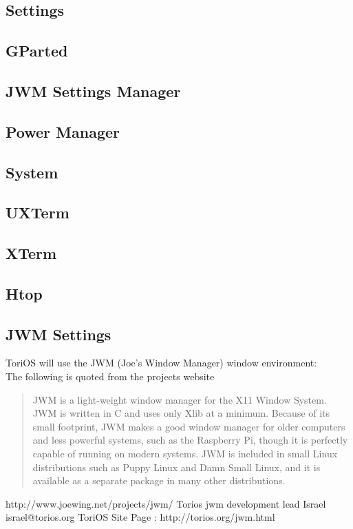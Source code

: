 \documentclass[12pt,a4paper]{book}
\begin{document}
\subsection{Settings}
\subsection{GParted}
\subsection{JWM Settings Manager}
\subsection{Power Manager}

\subsection{System}
\subsection{UXTerm}
\subsection{XTerm}
\subsection{Htop}



\subsection{JWM Settings}
ToriOS will use the JWM (Joe's Window Manager) window environment:\\

The following is quoted from the projects website

\begin{quote}
JWM is a light-weight window manager for the X11 Window System. JWM is written in C and uses only Xlib at a minimum. Because of its small footprint, JWM makes a good window manager for older computers and less powerful systems, such as the Raspberry Pi, though it is perfectly capable of running on modern systems. JWM is included in small Linux distributions such as Puppy Linux and Damn Small Linux, and it is available as a separate package in many other distributions. 
\end{quote}
http://www.joewing.net/projects/jwm/
Torios jwm development lead Israel israel@torios.org
ToriOS Site Page : http://torios.org/jwm.html
\newpage
\end{document}
